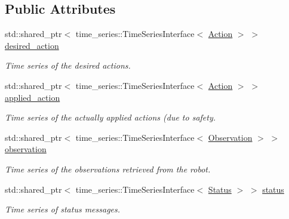 \subsection*{Public Attributes}
\begin{DoxyCompactItemize}
\item 
std\+::shared\+\_\+ptr$<$ time\+\_\+series\+::\+Time\+Series\+Interface$<$ \hyperlink{classAction}{Action} $>$ $>$ \hyperlink{classrobot__interfaces_1_1RobotData_a03b4160b90de7eac5ffb67cb8a872cee}{desired\+\_\+action}\hypertarget{classrobot__interfaces_1_1RobotData_a03b4160b90de7eac5ffb67cb8a872cee}{}\label{classrobot__interfaces_1_1RobotData_a03b4160b90de7eac5ffb67cb8a872cee}

\begin{DoxyCompactList}\small\item\em Time series of the desired actions. \end{DoxyCompactList}\item 
std\+::shared\+\_\+ptr$<$ time\+\_\+series\+::\+Time\+Series\+Interface$<$ \hyperlink{classAction}{Action} $>$ $>$ \hyperlink{classrobot__interfaces_1_1RobotData_a05fea4d2f75f7fc34daf2bfc71fbfc4b}{applied\+\_\+action}\hypertarget{classrobot__interfaces_1_1RobotData_a05fea4d2f75f7fc34daf2bfc71fbfc4b}{}\label{classrobot__interfaces_1_1RobotData_a05fea4d2f75f7fc34daf2bfc71fbfc4b}

\begin{DoxyCompactList}\small\item\em Time series of the actually applied actions (due to safety. \end{DoxyCompactList}\item 
std\+::shared\+\_\+ptr$<$ time\+\_\+series\+::\+Time\+Series\+Interface$<$ \hyperlink{classObservation}{Observation} $>$ $>$ \hyperlink{classrobot__interfaces_1_1RobotData_ae3d13595b92f82f76b0f1df2961258bd}{observation}\hypertarget{classrobot__interfaces_1_1RobotData_ae3d13595b92f82f76b0f1df2961258bd}{}\label{classrobot__interfaces_1_1RobotData_ae3d13595b92f82f76b0f1df2961258bd}

\begin{DoxyCompactList}\small\item\em Time series of the observations retrieved from the robot. \end{DoxyCompactList}\item 
std\+::shared\+\_\+ptr$<$ time\+\_\+series\+::\+Time\+Series\+Interface$<$ \hyperlink{structrobot__interfaces_1_1Status}{Status} $>$ $>$ \hyperlink{classrobot__interfaces_1_1RobotData_a47c53daf923c30981d15008e5134f648}{status}\hypertarget{classrobot__interfaces_1_1RobotData_a47c53daf923c30981d15008e5134f648}{}\label{classrobot__interfaces_1_1RobotData_a47c53daf923c30981d15008e5134f648}

\begin{DoxyCompactList}\small\item\em Time series of status messages. \end{DoxyCompactList}\end{DoxyCompactItemize}



